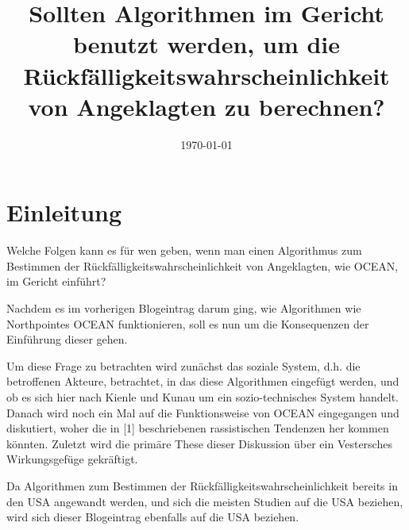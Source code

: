 \documentclass[10pt, a4paper, twocolumn]{article} %
\title{Sollten Algorithmen im Gericht benutzt werden, um die Rückfälligkeitswahrscheinlichkeit von Angeklagten zu berechnen? } %
\author{
	\authorstyle{Gruppe: 10\\ Journalist: Jonas Opitz\\ Chefredakteur: Frank Eric Mbouga} %
}
\date{\today} %
\begin{document}
\maketitle %

\thispagestyle{firstpage} %


\section{Einleitung}
Welche Folgen kann es für wen geben, wenn man einen Algorithmus zum Bestimmen der Rückfälligkeitswahrscheinlichkeit von Angeklagten, wie OCEAN, im Gericht einführt?

Nachdem es im vorherigen Blogeintrag darum ging, wie Algorithmen wie Northpointes OCEAN funktionieren, soll es nun um die Konsequenzen der Einführung dieser gehen.

Um diese Frage zu betrachten wird zunächst das soziale System, d.h. die betroffenen Akteure, betrachtet, in das diese Algorithmen eingefügt werden, und ob es sich hier nach Kienle und Kunau um ein sozio-technisches System handelt.
Danach wird noch ein Mal auf die Funktionsweise von OCEAN eingegangen und diskutiert, woher die in [1] beschriebenen rassistischen Tendenzen her kommen könnten.
Zuletzt wird die primäre These dieser Diskussion über ein Vestersches Wirkungsgefüge gekräftigt.

Da Algorithmen zum Bestimmen der Rückfälligkeitswahrscheinlichkeit bereits in den USA angewandt werden, und sich die meisten Studien auf die USA beziehen, wird sich dieser Blogeintrag ebenfalls auf die USA beziehen.

\end{document}
